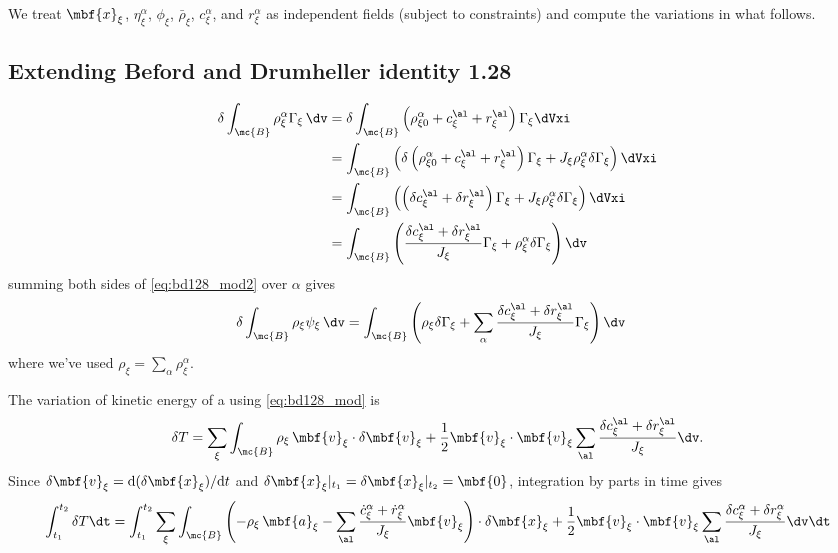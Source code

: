 We treat $\mbf{x}_\xi$, $\eta^\alpha_\xi$, $\phi_\xi$, $\bar\rho_\xi$, $c_\xi^\alpha$, and $r_\xi^\alpha$ as independent fields (subject to constraints) and compute the variations in what follows.

\subsection{Extending Beford and Drumheller identity 1.28}
\begin{align}
  \delta \int_{\mc{B}} \rho^\alpha_\xi \Gamma_\xi \, \dv
  &= \delta \int_{\mc{B}} \left(\rho^\alpha_{\xi 0} + c^\al_\xi + r^\al_\xi \right) \Gamma_\xi \dVxi \notag \\
  &= \int_{\mc{B}} \left( \delta \left(\rho^\alpha_{\xi 0} + c^\al_\xi + r^\al_\xi \right) \Gamma_\xi + J_\xi \rho^\alpha_\xi \delta \Gamma_\xi \right)  \dVxi \notag \\
  &= \int_{\mc{B}} \left( \left(\delta c^\al_\xi + \delta r^\al_\xi\right) \Gamma_\xi + J_\xi \rho^\alpha_\xi \delta \Gamma_\xi \right)  \dVxi \notag \\
  &= \int_{\mc{B}} \left( \frac{\delta c^\al_\xi + \delta r^\al_\xi}{J_\xi} \Gamma_\xi + \rho^\alpha_\xi \delta \Gamma_\xi \right)  \dv
  \label{eq:bd128_mod2}
\end{align}
%
summing both sides of \eqref{eq:bd128_mod2} over $\alpha$ gives
\begin{align}
  \delta \int_{\mc{B}} \rho_\xi \psi_\xi \, \dv
  &= \int_{\mc{B}} \left(\rho_\xi \delta \Gamma_\xi + \sum_\alpha \frac{\delta c^\al_\xi + \delta r^\al_\xi}{J_\xi} \Gamma_\xi  \right)  \dv
  \label{eq:bd128_mod}
\end{align}
%
where we've used $\rho_\xi = \sum_\alpha \rho^\alpha_\xi$.
\label{sec:var_T_app}

The variation of kinetic energy of a using \eqref{eq:bd128_mod} is
\begin{equation}
  \delta T = \sum_\xi \int_{\mc{B}} \rho_\xi\,\mbf{v}_\xi \cdot \delta\mbf{v}_\xi + \frac{1}{2} \mbf{v}_\xi \cdot \mbf{v}_\xi \sum_\al \frac{\delta c^\al_\xi + \delta r^\al_\xi}{J_\xi} \dv.
\end{equation}
Since $\delta\mbf{v}_\xi = \mathrm{d}(\delta\mbf{x}_\xi)/\mathrm{d}t$ and $\delta\mbf{x}_\xi\vert_{t_1} = \delta\mbf{x}_\xi\vert_{t_2} = \mbf{0}$, integration by parts in time gives
\begin{equation}
  \int_{t_1}^{t_2} \delta T \dt
  = \int_{t_1}^{t_2} \sum_\xi \int_{\mc{B}} \left(-\rho_\xi\,\mbf{a}_\xi - \sum_\al \frac{\dot{c}^\alpha_\xi + \dot r^\alpha_\xi}{J_\xi} \mbf{v}_\xi \right) \cdot \delta\mbf{x}_\xi + \frac{1}{2} \mbf{v}_\xi \cdot \mbf{v}_\xi \sum_\al \frac{\delta c_\xi^\alpha + \delta r_\xi^\alpha}{J_\xi}  \dv \dt
  \label{eq:deltaT_app}
\end{equation}

